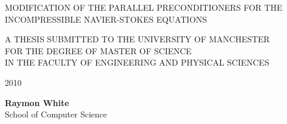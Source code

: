\begin{titlepage}
\begin{center}
\vspace*{1in}
{\Huge MODIFICATION OF THE \vspace*{0.3in} PARALLEL \vspace*{0.3in} PRECONDITIONERS FOR THE INCOMPRESSIBLE \vspace*{0.3in} NAVIER-STOKES EQUATIONS}

\vspace*{1.5in}

{A THESIS SUBMITTED TO THE UNIVERSITY OF MANCHESTER \\ FOR THE
DEGREE OF MASTER OF SCIENCE \\ IN THE FACULTY OF ENGINEERING AND PHYSICAL SCIENCES}

\vspace*{1.5in}

{2010}

\vspace*{1.5in}

{{\bfseries Raymon White} \\ School of Computer Science}

\end{center}

\end{titlepage}
